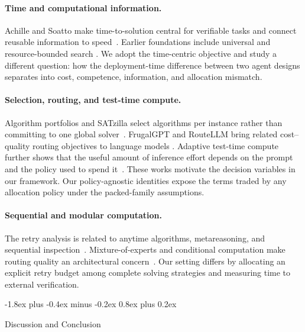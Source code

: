 \documentclass[10pt,twocolumn]{article}
\makeatletter
\theoremstyle{paperplain}
\theoremstyle{paperdefinition}
\theoremstyle{paperremark}
\renewcommand{\section}{%
  \@startsection{section}{1}{\z@}%
    {-1.8ex plus -0.4ex minus -0.2ex}%
    {0.8ex plus 0.2ex}%
    {\normalfont\large\bfseries\raggedright}}
\makeatother
\begin{document}
\paragraph{Time and computational information.}
Achille and Soatto make time-to-solution central for verifiable tasks and
connect reusable information to speed~\cite{achille2026}.  Earlier
foundations include universal and resource-bounded search
\cite{solomonoff1964,levin1973,livitanyi2008,levin_1984_randomness_conservation,
schmidhuber_2002_speed_prior}.  We adopt the time-centric objective and study a
different question: how the deployment-time difference between two agent
designs separates into cost, competence, information, and allocation mismatch.

\paragraph{Selection, routing, and test-time compute.}
Algorithm portfolios and SATzilla select algorithms per instance rather than
committing to one global solver~\cite{gomes-selman2001,
xu_hutter_hoos_leytonbrown_2008_satzilla}.  FrugalGPT and RouteLLM bring related
cost--quality routing objectives to language models
\cite{chen2023frugalgpt,ong2024routellm}.  Adaptive test-time compute further
shows that the useful amount of inference effort depends on the prompt and the
policy used to spend it~\cite{snell2024testtime}.  These works motivate the
decision variables in our framework.  Our policy-agnostic identities expose the
terms traded by any allocation policy under the packed-family assumptions.

\paragraph{Sequential and modular computation.}
The retry analysis is related to anytime algorithms, metareasoning, and
sequential inspection~\cite{zilberstein_1996_anytime_systems,
hansen_2001_monitoring_anytime,russell_wefald_1991_dotherightthing,weitzman1979,
wald1947,chernoff1959}.  Mixture-of-experts and conditional computation make
routing quality an architectural concern~\cite{jordan_jacobs_1994_hme,
shazeer_2017_moe,fedus_zoph_shazeer_2022_switch}.  Our setting differs by
allocating an explicit retry budget among complete solving strategies and
measuring time to external verification.

\section{Discussion and Conclusion}
\label{sec:discussion}
\end{document}
